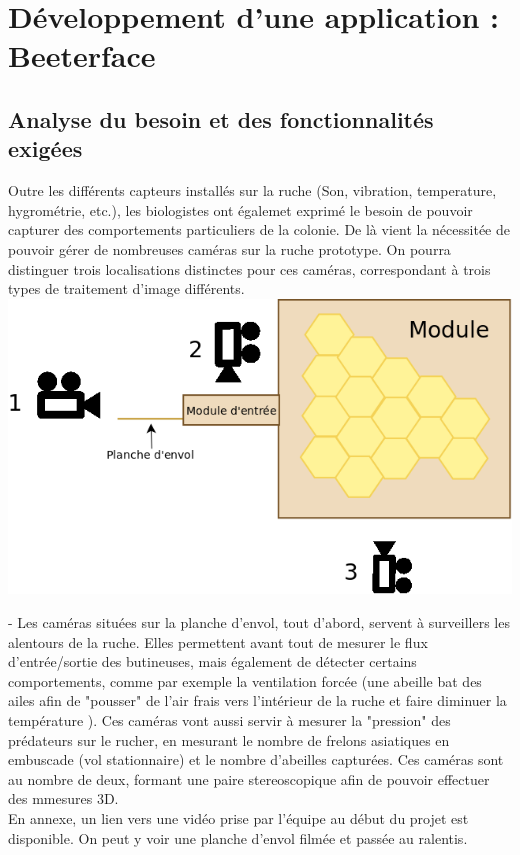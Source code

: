 \documentclass[11pt,french,a4paper]{report}
\begin{document}
\chapter{Développement d'une application : Beeterface}

    \section{Analyse du besoin et des fonctionnalités exigées}

Outre les différents capteurs installés sur la ruche (Son, vibration, temperature, hygrométrie, etc.), les biologistes ont égalemet exprimé le
besoin de pouvoir capturer des comportements particuliers de la colonie. De là vient la nécessitée de pouvoir gérer de nombreuses caméras sur la ruche
prototype. On pourra distinguer trois localisations distinctes pour ces caméras, correspondant à trois types de traitement d'image différents. \\

\includegraphics[scale=0.3]{../images/dia/schema_camera.png}


- Les caméras situées sur la planche d'envol, tout d'abord, servent à surveillers 
  les alentours de la ruche. Elles permettent avant tout de
  mesurer le flux d'entrée/sortie des butineuses, mais également de détecter
  certains comportements, comme par exemple la ventilation forcée (une abeille
  bat des ailes afin de "pousser" de l'air frais vers l'intérieur de la ruche et faire
  diminuer la température ). Ces caméras vont aussi servir à mesurer la
  "pression" des prédateurs sur le rucher, en mesurant le nombre de frelons
  asiatiques en embuscade (vol stationnaire) et le nombre d'abeilles
  capturées. Ces caméras sont au nombre de deux, formant une paire
  stereoscopique afin de pouvoir effectuer des mmesures 3D. \\
  En annexe, un lien vers une vidéo prise par l'équipe au début du projet est disponible. 
  On peut y voir une planche d'envol filmée et passée au ralentis. \\ 
\end{document}
